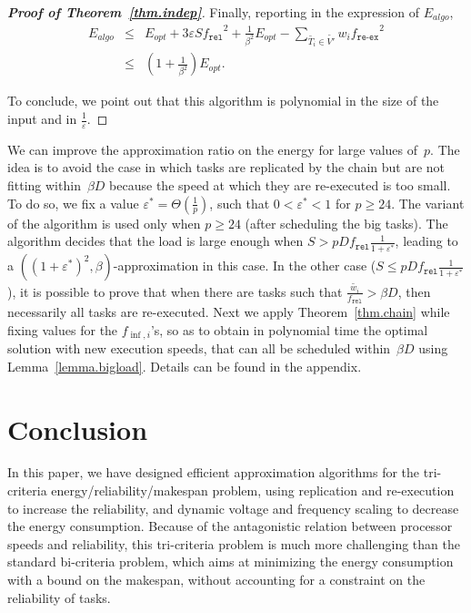 \documentclass[a4paper]{article}
\theoremstyle{plain}
\theoremstyle{definition}
\theoremstyle{remark}
\newcommand{\finf}{\ensuremath{f_{\inf,i}}\xspace}
\newcommand{\fr}{\ensuremath{f_{\texttt{rel}}}\xspace}
\newcommand{\freex}{\ensuremath{f_{\texttt{re-ex}}}\xspace}
\begin{document}
\begin{proof}[{\bf Proof of Theorem~\ref{thm.indep}}]
Finally, reporting in the expression of $E_{algo}$, \begin{equation*}
\begin{array}{rcl} 
E_{algo}\! &\leq& E_{opt} \!+ 3\varepsilon S \fr^2 \!+ \frac{1}{\beta^2} E_{opt}
- \sum_{\tilde{T_i}\in\tilde{V'}}w_i\freex^2 \\
&\leq& \left(1+\frac{1}{\beta^2}\right) E_{opt}.
 \end{array}
\end{equation*} 


\medskip
To conclude, we point out that this algorithm is polynomial in the
size of the input and in $\frac{1}{\varepsilon}$. 
\end{proof}

We can improve the approximation ratio on the energy for large values
of~$p$. The idea is to avoid the case in which tasks are replicated by the
chain but are not fitting within~$\beta D$ because the speed at which
they are re-executed is too small. To do so, we fix a value
$\varepsilon^*=\Theta\left(\frac{1}{p}\right)$, such that
$0<\varepsilon^*<1$ for $p\geq 24$. The variant of the algorithm is
used only when $p\geq 24$ (after scheduling the big tasks). 
The algorithm decides that the load is large enough when $S>pD\fr
\frac{1}{1+\varepsilon^*}$, leading to a
$((1+\varepsilon^*)^2,\beta)$-approximation in this case. In the other
case ($S\leq pD\fr \frac{1}{1+\varepsilon^*}$), it is possible to
prove that when there are tasks such that
$\frac{\tilde{w_i}}{\fr}>\beta D$, then necessarily all tasks are
re-executed. Next we apply Theorem~\ref{thm.chain} while fixing values
for the $\finf$'s, so as to obtain in polynomial time the optimal
solution with new execution speeds, that can all be scheduled
within~$\beta D$ using Lemma~\ref{lemma.bigload}.  Details can be
found in the appendix.


\section{Conclusion}
\label{sec.conclusion}
In this paper, we have designed efficient approximation algorithms for
the tri-criteria energy/reliability/make\-span problem, using
replication and re-execution to increase the reliability, and dynamic
voltage and frequen\-cy scaling to decrease the energy consumption.
Because of the antagonistic relation between processor speeds and
reliability, this tri-criteria problem is much more challenging than
the standard bi-criteria problem, which aims at minimizing the energy
consumption with a bound on the makespan, without accounting for a
constraint on the reliability of tasks.
\end{document}
